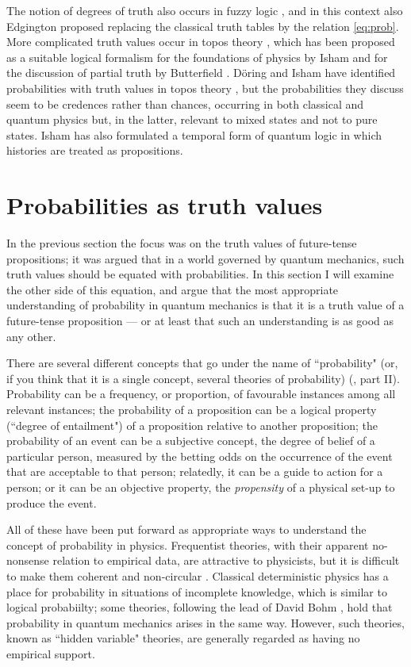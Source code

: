 \documentclass[12pt,reqno]{article}
\renewcommand{\(}{\left(}
\renewcommand{\)}{\right)}
\newcommand{\<}{\langle}
\renewcommand{\>}{\rangle}
\theoremstyle{plain} %
\begin{document}
The notion of degrees of truth also occurs in fuzzy logic \cite{Zadeh:fuzzy,Edgington,Sainsbury}, and in this context also Edgington proposed replacing the classical truth tables by the relation \eqref{eq:prob}. More complicated truth values occur in topos theory \cite{Lawvere}, which has been proposed as a suitable logical formalism for the foundations of physics by Isham  \cite{Isham:topos} and for the discussion of partial truth by Butterfield \cite{Butterfield:partial}. D\"oring and Isham have identified probabilities with truth values in topos theory \cite{DoringIsham:prob}, but the probabilities they discuss seem to be credences rather than chances, occurring in both classical and quantum physics but, in the latter, relevant to mixed states and not to pure states. Isham has also formulated a temporal form of quantum logic \cite{Isham:temporalqlogic} in which histories are treated as propositions.

\section{Probabilities as truth values}

In the previous section the focus was on the truth values of future-tense propositions; it was argued that in a world governed by quantum mechanics, such truth values should be equated with probabilities. In this section I will examine the other side of this equation, and argue that the most appropriate understanding of probability in quantum mechanics is that it is a truth value of a future-tense proposition --- or at least that such an understanding is as good as any other.

There are several different concepts that go under the name of ``probability" (or, if you think that it is a single concept, several theories of probability) (\cite{Gillies}, \cite{Wallace:multiverse} part II). Probability can be a frequency, or proportion, of favourable instances among all relevant instances; the probability of a proposition can be a logical property (``degree of entailment") of a proposition relative to another proposition; the probability of an event can be a subjective concept, the degree of belief of a particular person, measured by the betting odds on the occurrence of the event that are acceptable to that person; relatedly, it can be a guide to action for a person; or it can be an objective property, the \emph{propensity} of a physical set-up to produce the event.  

All of these have been put forward as appropriate ways to understand the concept of probability in physics. Frequentist theories, with their apparent no-nonsense relation to empirical data, are attractive to physicists, but it is difficult to make them coherent and non-circular \cite{Wallace:multiverse}.  Classical deterministic physics has a place for probability in situations of incomplete knowledge, which is similar to logical probabiilty; some theories, following the lead of David Bohm \cite{Bohmian}, hold that probability in quantum mechanics arises in the same way. However, such theories, known as ``hidden variable" theories, are generally regarded as having no empirical support. 
\end{document}
